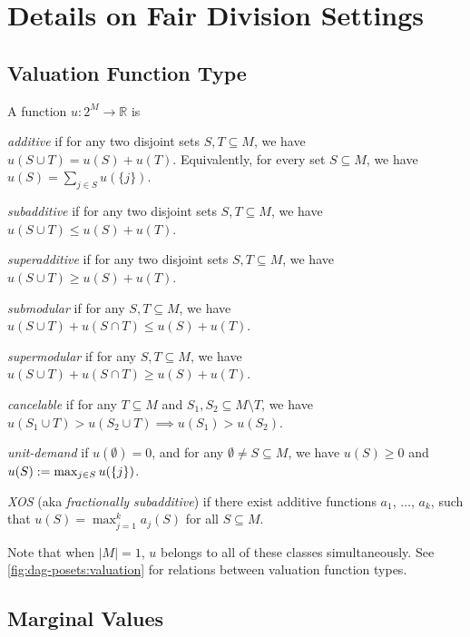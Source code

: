 \section{Details on Fair Division Settings}
\label{sec:settings-extra}

\subsection{Valuation Function Type}

A function $u: 2^M \to \mathbb{R}$ is
\begin{tightenum}
\item \emph{additive} if for any two disjoint sets $S, T \subseteq M$, we have $u(S \cup T) = u(S) + u(T)$.
    Equivalently, for every set $S \subseteq M$, we have $u(S) = \sum_{j \in S} u(\{j\})$.
\item \emph{subadditive} if for any two disjoint sets $S, T \subseteq M$, we have $u(S \cup T) \le u(S) + u(T)$.
\item \emph{superadditive} if for any two disjoint sets $S, T \subseteq M$, we have $u(S \cup T) \ge u(S) + u(T)$.
\item \emph{submodular} if for any $S, T \subseteq M$, we have $u(S \cup T) + u(S \cap T) \le u(S) + u(T)$.
\item \emph{supermodular} if for any $S, T \subseteq M$, we have $u(S \cup T) + u(S \cap T) \ge u(S) + u(T)$.
\item \emph{cancelable} \citep{berger2021almost} if
    for any $T \subseteq M$ and $S_1, S_2 \subseteq M \setminus T$,
    we have $u(S_1 \cup T) > u(S_2 \cup T) \implies u(S_1) > u(S_2)$.
\item \emph{unit-demand} if $u(\emptyset) = 0$, and for any $\emptyset \neq S \subseteq M$,
    we have $u(S) \ge 0$ and $u(S) := \max_{j \in S} u(\{j\})$.
\item \emph{XOS} (aka \emph{fractionally subadditive}) \citep{nisan2000bidding,feige2009maximizing}
    if there exist additive functions $a_1$, $\ldots$, $a_k$, such that
    $u(S) = \max_{j=1}^k a_j(S)$ for all $S \subseteq M$.
\end{tightenum}

Note that when $|M|=1$, $u$ belongs to all of these classes simultaneously.
See \cref{fig:dag-posets:valuation} for relations between valuation function types.

\subsection{Marginal Values}


